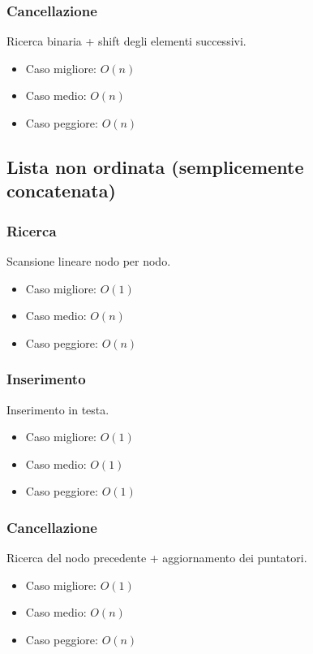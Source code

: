 \documentclass[a4paper,12pt]{article}
\begin{document}
\subsubsection{Cancellazione}
Ricerca binaria + shift degli elementi successivi.
\begin{itemize}
    \item Caso migliore: $O(n)$
    \item Caso medio: $O(n)$
    \item Caso peggiore: $O(n)$
\end{itemize}


\subsection{Lista non ordinata (semplicemente concatenata)}

\subsubsection{Ricerca}
Scansione lineare nodo per nodo.
\begin{itemize}
    \item Caso migliore: $O(1)$
    \item Caso medio: $O(n)$
    \item Caso peggiore: $O(n)$
\end{itemize}

\subsubsection{Inserimento}
Inserimento in testa.
\begin{itemize}
    \item Caso migliore: $O(1)$
    \item Caso medio: $O(1)$
    \item Caso peggiore: $O(1)$
\end{itemize}

\subsubsection{Cancellazione}
Ricerca del nodo precedente + aggiornamento dei puntatori.
\begin{itemize}
    \item Caso migliore: $O(1)$
    \item Caso medio: $O(n)$
    \item Caso peggiore: $O(n)$
\end{itemize}
\end{document}
